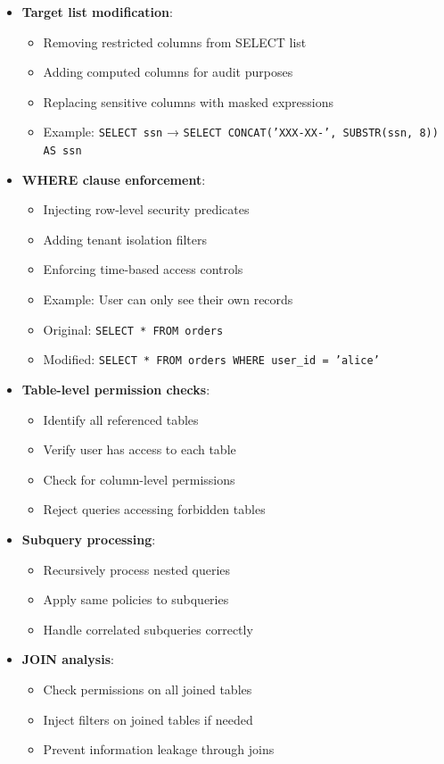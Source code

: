 \begin{itemize}
    \item \textbf{Target list modification}:
    \begin{itemize}
        \item Removing restricted columns from SELECT list
        \item Adding computed columns for audit purposes
        \item Replacing sensitive columns with masked expressions
        \item Example: \texttt{SELECT ssn} → \texttt{SELECT CONCAT('XXX-XX-', SUBSTR(ssn, 8)) AS ssn}
    \end{itemize}
    
    \item \textbf{WHERE clause enforcement}:
    \begin{itemize}
        \item Injecting row-level security predicates
        \item Adding tenant isolation filters
        \item Enforcing time-based access controls
        \item Example: User can only see their own records
        \item Original: \texttt{SELECT * FROM orders}
        \item Modified: \texttt{SELECT * FROM orders WHERE user\_id = 'alice'}
    \end{itemize}
    
    \item \textbf{Table-level permission checks}:
    \begin{itemize}
        \item Identify all referenced tables
        \item Verify user has access to each table
        \item Check for column-level permissions
        \item Reject queries accessing forbidden tables
    \end{itemize}
    
    \item \textbf{Subquery processing}:
    \begin{itemize}
        \item Recursively process nested queries
        \item Apply same policies to subqueries
        \item Handle correlated subqueries correctly
    \end{itemize}
    
    \item \textbf{JOIN analysis}:
    \begin{itemize}
        \item Check permissions on all joined tables
        \item Inject filters on joined tables if needed
        \item Prevent information leakage through joins
    \end{itemize}
\end{itemize}

